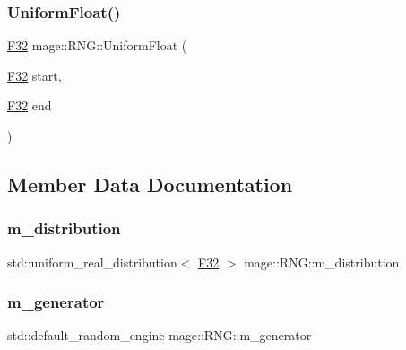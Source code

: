 \mbox{\label{classmage_1_1_r_n_g_a43acf77450062519dedd3e492614317d}} 
\subsubsection{\texorpdfstring{Uniform\+Float()}{UniformFloat()}}
{\footnotesize\ttfamily \mbox{\hyperlink{namespacemage_aa97e833b45f06d60a0a9c4fc22ae02c0}{F32}} mage\+::\+R\+N\+G\+::\+Uniform\+Float (\begin{DoxyParamCaption}\item[{\mbox{\hyperlink{namespacemage_aa97e833b45f06d60a0a9c4fc22ae02c0}{F32}}}]{start,  }\item[{\mbox{\hyperlink{namespacemage_aa97e833b45f06d60a0a9c4fc22ae02c0}{F32}}}]{end }\end{DoxyParamCaption})\hspace{0.3cm}{\ttfamily [noexcept]}}



\subsection{Member Data Documentation}
\mbox{\label{classmage_1_1_r_n_g_ac94e7e49a1751dfbfa590cd6da68b032}} 
\subsubsection{\texorpdfstring{m\+\_\+distribution}{m\_distribution}}
{\footnotesize\ttfamily std\+::uniform\+\_\+real\+\_\+distribution$<$ \mbox{\hyperlink{namespacemage_aa97e833b45f06d60a0a9c4fc22ae02c0}{F32}} $>$ mage\+::\+R\+N\+G\+::m\+\_\+distribution\hspace{0.3cm}{\ttfamily [private]}}

\mbox{\label{classmage_1_1_r_n_g_a43dc452c2e32d468fa42d16e02d3a283}} 
\subsubsection{\texorpdfstring{m\+\_\+generator}{m\_generator}}
{\footnotesize\ttfamily std\+::default\+\_\+random\+\_\+engine mage\+::\+R\+N\+G\+::m\+\_\+generator\hspace{0.3cm}{\ttfamily [private]}}

